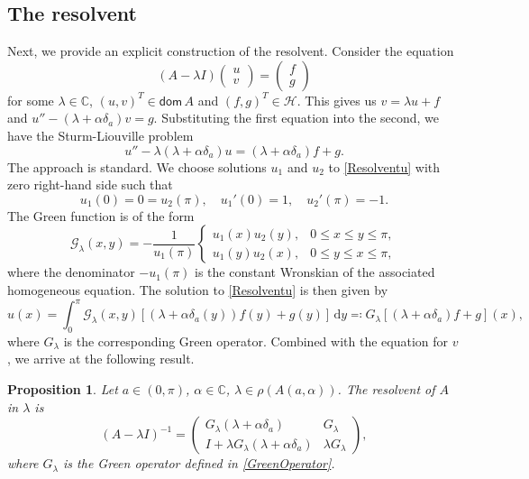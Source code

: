 \documentclass[11pt, a4paper,reqno]{amsart}
\theoremstyle{plain}
\newtheorem{proposition}[theorem]{Proposition}
\theoremstyle{definition}
\theoremstyle{remark}
\newcommand{\dd}{\,\textrm{d}}
\renewcommand{\leq}{\leqslant}	\renewcommand{\geq}{\geqslant}
\newcommand{\1}{\mathds 1}
\newcommand{\Dom}{\mathsf{dom}\,}
\begin{document}
\subsection{The resolvent}\label{SecResolvent}
Next, we provide an explicit construction of the resolvent. Consider the equation
\[
(A-\lambda I)\begin{pmatrix}
    u \\ v
\end{pmatrix} = \begin{pmatrix}
    f \\ g
\end{pmatrix}
\]
for some $\lambda \in \mathbb C$, $(u, v)^T \in \Dom A$ and $(f, g)^T \in \mathcal H$.
This gives us $v = \lambda u + f$ and $u'' -(\lambda + \alpha \delta_a)v = g$. Substituting the first equation into the second, we have the Sturm-Liouville problem
\begin{equation}
    u'' - \lambda(\lambda + \alpha\delta_a)u = (\lambda + \alpha\delta_a)f + g.
    \label{Resolventu}
\end{equation}
The approach is standard. We choose solutions $u_1$ and $u_2$ to \eqref{Resolventu} with zero right-hand side such that
\[
u_1(0) = 0 = u_2(\pi), \quad u_1'(0) = 1, \quad u_2'(\pi) = -1.
\]
The Green function is of the form
\begin{equation}
\mathcal G_\lambda(x,y) = -\frac{1}{u_1(\pi)} \begin{cases} u_1(x)u_2(y), & 0 \leq x \leq y \leq \pi, \\ 
u_1(y)u_2(x), & 0 \leq y \leq x \leq \pi,    
\end{cases}
\label{eq: Green function}
\end{equation}
where the denominator $-u_1(\pi)$ is the constant Wronskian of the associated homogeneous equation. The solution to \eqref{Resolventu} is then given by
\begin{equation}
u(x) = \int_0^\pi\mathcal G_\lambda(x,y)[(\lambda + \alpha\delta_a(y))f(y) + g(y)]\dd y \eqqcolon G_\lambda\left[(\lambda +\alpha\delta_a)f + g\right](x),
\label{GreenOperator}
\end{equation}
where $G_\lambda$ is the corresponding Green operator. Combined with the equation for $v$, we arrive at the following result.
\begin{proposition}
Let $a \in (0, \pi)$, $\alpha \in \mathbb C$, $\lambda \in \rho(A(a, \alpha))$. The resolvent of $A$ in $\lambda$ is
\begin{equation}
(A-\lambda I)^{-1} = \begin{pmatrix}
    G_\lambda(\lambda + \alpha\delta_a) & G_\lambda \\ I + \lambda G_\lambda(\lambda + \alpha\delta_a) & \lambda G_\lambda
\end{pmatrix},
    \label{Resolvent}
\end{equation}
where $G_\lambda$ is the Green operator defined in \eqref{GreenOperator}.
\end{proposition}
\end{document}
